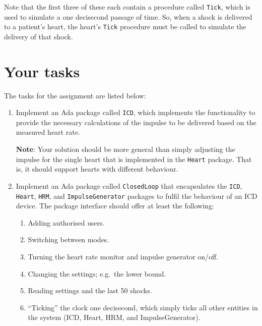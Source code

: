 \documentclass[11pt]{article}
\begin{document}
Note that the first three of these each contain a procedure called \texttt{Tick}, which is used to simulate a one decisecond passage of time. So, when a shock is delivered to a patient's heart, the heart's \texttt{Tick} procedure must be called to simulate the delivery of that shock.

\section{Your tasks}

The tasks for the assignment are listed below:

\begin{enumerate}

 \item Implement an Ada package called \texttt{ICD}, which implements the functionality to provide the necessary calculations of the impulse to be delivered based on the measured heart rate.

 \textbf{Note}: Your solution should be more general than simply adjusting the impulse for the single heart that is implemented in the \texttt{Heart} package. That is, it should support hearts with different behaviour.

 \item Implement an Ada package called \texttt{ClosedLoop} that encapsulates the \texttt{ICD}, \texttt{Heart}, \texttt{HRM}, and \texttt{ImpulseGenerator} packages to fulfil the behaviour of an ICD device. The package interface should offer at least the following:

  \begin{enumerate}

    \item Adding authorised users.

    \item Switching between modes.

    \item Turning the heart rate monitor and impulse generator on/off.

    \item Changing the settings; e.g.\ the lower bound.

    \item Reading settings and the last 50 shocks.

    \item ``Ticking'' the clock one decisecond, which simply ticks all other entities in the system (ICD, Heart, HRM, and ImpulseGenerator).
  \end{enumerate}


\end{enumerate}
\end{document}
